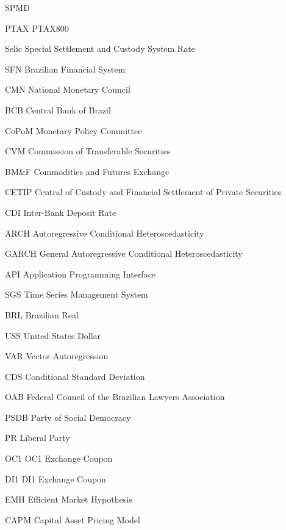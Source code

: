 \documentclass[cic,tc, english]{iiufrgs}
\begin{document}
\begin{listofabbrv}{SPMD}
    \item[PTAX] PTAX800
    \item[Selic] Special Settlement and Custody System Rate
    \item[SFN] Brazilian Financial System
    \item[CMN] National Monetary Council
    \item[BCB] Central Bank of Brazil
    \item[CoPoM] Monetary Policy Committee
    \item[CVM] Commission of Transferable Securities
    \item[BM\&F] Commodities and Futures Exchange
    \item[CETIP] Central of Custody and Financial Settlement of Private Securities
    \item[CDI] Inter-Bank Deposit Rate
    \item[ARCH]	Autoregressive Conditional Heteroscedasticity
    \item[GARCH] General Autoregressive Conditional Heteroscedasticity
    \item[API] Application Programming Interface
    \item[SGS] Time Series Management System
    \item[BRL] Brazilian Real
    \item[USS] United States Dollar
    \item[VAR] Vector Autoregression
    \item[CDS] Conditional Standard Deviation
    \item[OAB] Federal Council of the Brazilian Lawyers Association
    \item[PSDB]	Party of Social Democracy
    \item[PR] Liberal Party
    \item[OC1] OC1 Exchange Coupon	
    \item[DI1] DI1 Exchange Coupon
    \item[EMH] Efficient Market Hypothesis
    \item[CAPM] Capital Asset Pricing Model

\end{listofabbrv}

\tableofcontents

\end{document}
